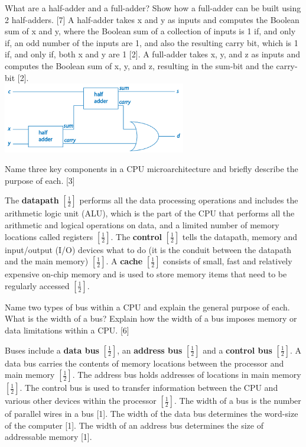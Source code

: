 \documentclass[grid,avery5388]{flashcards}
\begin{document}
\begin{flashcard}[]{
What are a half-adder and a full-adder? Show how a full-adder can be
built using 2 half-adders. [7]
}
A half-adder takes x and y as inputs and computes the Boolean sum
of x and y, where the Boolean sum of a collection of inputs is 1 if, and
only if, an odd number of the inputs are 1, and also the resulting carry
bit, which is 1 if, and only if, both x and y are 1 [2]. A full-adder takes
x, y, and z as inputs and computes the Boolean sum of x, y, and z,
resulting in the sum-bit and the carry-bit [2].\\
\includegraphics[width=8cm]{full_adder.png}
\end{flashcard}

\begin{flashcard}[]{Name three key components in a CPU microarchitecture and briefly
describe the purpose of each. [3]}

The \textbf{datapath} $[\frac{1}{2}]$ performs all the data processing operations and includes
the arithmetic logic unit (ALU), which is the part of the CPU
that performs all the arithmetic and logical operations on data, and a
limited number of memory locations called registers $[\frac{1}{2}]$. The \textbf{control}
$[\frac{1}{2}]$ tells the datapath, memory and input/output (I/O) devices what
to do (it is the conduit between the datapath and the main memory) $[\frac{1}{2}]$. A \textbf{cache} $[\frac{1}{2}]$ consists of small, fast and relatively expensive on-chip
memory and is used to store memory items that need to be regularly
accessed $[\frac{1}{2}]$.

\end{flashcard}


\begin{flashcard}[]{Name two types of bus within a CPU and explain the general purpose
of each. What is the width of a bus? Explain how the width of a bus
imposes memory or data limitations within a CPU. [6]}

Buses include a \textbf{data bus} $[\frac{1}{2}]$, an \textbf{address bus} $[\frac{1}{2}]$ and a \textbf{control bus} $[\frac{1}{2}]$. A data bus carries the contents of memory locations between the
processor and main memory $[\frac{1}{2}]$. The address bus holds addresses of
locations in main memory $[\frac{1}{2}]$. The control bus is used to transfer
information between the CPU and various other devices within the
processor $[\frac{1}{2}]$. The width of a bus is the number of parallel wires in
a bus [1]. The width of the data bus determines the word-size of the
computer [1]. The width of an address bus determines the size of
addressable memory [1].

\end{flashcard}
\end{document}
